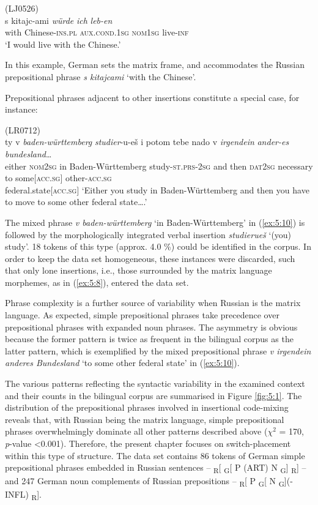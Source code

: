 \ea
\label{ex:5:9}
(LJ0526)\\
\gll s kitajc-ami \textit{würde} \textit{ich} \textit{leb-en}\\
	{with} Chinese-\textsc{ins.pl} \textsc{aux.cond.1sg} \textsc{nom1sg} live-\textsc{inf}\\
\glt `I would live with the Chinese.'
\z

\noindent
In this example, German sets the matrix frame, and accommodates the Russian prepositional phrase \textit{s kitajcami} `with the Chinese'. 

Prepositional phrases adjacent to other insertions constitute a special case, for instance:

\ea
\label{ex:5:10}
(LR0712)\\
 {ty} {v} \textit{baden-württemberg} \textit{studier}-{u-eš} {i} {potom} {tebe} {nado} {v} \textit{irgendein} \textit{ander-es} \textit{bundesland}\dots{}\\
	{either} \textsc{nom2sg} in Baden-Württemberg study-\textsc{st.prs-2sg} and then \textsc{dat2sg} necessary to some\([\)\textsc{acc.sg}\(]\) other-\textsc{acc.sg}\\ federal.state\([\)\textsc{acc.sg}\(]\)
\glt `Either you study in Baden-Württemberg and then you have to move to some other federal state\dots{}.'
\z

\noindent The mixed phrase \textit{v baden-württemberg} `in Baden-Württemberg' in (\ref{ex:5:10}) is followed by the morphologically integrated verbal insertion \textit{studierueš} `(you) study'. 18 tokens of this type (approx. 4.0 \%) could be identified in the corpus. In order to keep the data set homogeneous, these instances were discarded, such that only lone insertions, i.e., those surrounded by the matrix language morphemes, as in (\ref{ex:5:8}), entered the data set.

Phrase complexity is a further source of variability  when Russian is the matrix language. As expected, simple prepositional phrases take precedence over prepositional phrases with expanded noun phrases. The asymmetry is obvious because the former pattern is twice as frequent in the bilingual corpus as the latter pattern, which is exemplified by the mixed prepositional phrase \textit{v irgendein anderes Bundesland} `to some other federal state' in (\ref{ex:5:10}). 

The various patterns reflecting the syntactic variability in the examined context and their counts in the bilingual corpus are summarised in Figure \ref{fig:5:1}. The distribution of the prepositional phrases involved in insertional code-mixing reveals that, with Russian being the matrix language, simple prepositional phrases overwhelmingly dominate all other patterns described above ($χ^2$ = 170, \textit{p}-value \textless 0.001). Therefore, the present chapter focuses on switch-placement within this type of structure. The data set contains 86 tokens of German simple prepositional phrases embedded in Russian sentences -- \textsubscript{R}[ \textsubscript{G}[ P (ART) N \textsubscript{G}] \textsubscript{R}] -- and 247 German noun complements of Russian prepositions -- \textsubscript{R}[ P \textsubscript{G}[ N  \textsubscript{G}](-INFL) \textsubscript{R}].

